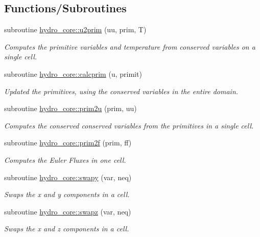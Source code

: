 \subsection*{Functions/\+Subroutines}
\begin{DoxyCompactItemize}
\item 
subroutine \hyperlink{namespacehydro__core_a360e3d64343b30d94d270cfebc5b4eb3}{hydro\+\_\+core\+::u2prim} (uu, prim, T)
\begin{DoxyCompactList}\small\item\em Computes the primitive variables and temperature from conserved variables on a single cell. \end{DoxyCompactList}\item 
subroutine \hyperlink{namespacehydro__core_a991a14316cc93864150071b30fd9c772}{hydro\+\_\+core\+::calcprim} (u, primit)
\begin{DoxyCompactList}\small\item\em Updated the primitives, using the conserved variables in the entire domain. \end{DoxyCompactList}\item 
subroutine \hyperlink{namespacehydro__core_a98cafc8f97d7a1b3f8050b8e442194c3}{hydro\+\_\+core\+::prim2u} (prim, uu)
\begin{DoxyCompactList}\small\item\em Computes the conserved conserved variables from the primitives in a single cell. \end{DoxyCompactList}\item 
subroutine \hyperlink{namespacehydro__core_a725c2c598f080ea420f4043dbda3f996}{hydro\+\_\+core\+::prim2f} (prim, ff)
\begin{DoxyCompactList}\small\item\em Computes the Euler Fluxes in one cell. \end{DoxyCompactList}\item 
subroutine \hyperlink{namespacehydro__core_a64856096f7a7b7f65be1154d31916c2d}{hydro\+\_\+core\+::swapy} (var, neq)
\begin{DoxyCompactList}\small\item\em Swaps the x and y components in a cell. \end{DoxyCompactList}\item 
subroutine \hyperlink{namespacehydro__core_ae4216bc7908e7665f0565aa8c885c821}{hydro\+\_\+core\+::swapz} (var, neq)
\begin{DoxyCompactList}\small\item\em Swaps the x and z components in a cell. \end{DoxyCompactList}\item 

\end{DoxyCompactItemize}
